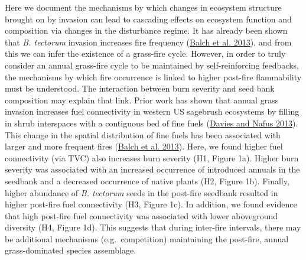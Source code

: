 \documentclass[
  12pt,
]{article}
\begin{document}
Here we document the mechanisms by which changes in ecosystem structure
brought on by invasion can lead to cascading effects on ecosystem
function and composition via changes in the disturbance regime. It has
already been shown that \emph{B. tectorum} invasion increases fire
frequency (\protect\hyperlink{ref-Balch2013}{Balch et al. 2013}), and
from this we can infer the existence of a grass-fire cycle. However, in
order to truly consider an annual grass-fire cycle to be maintained by
self-reinforcing feedbacks, the mechanisms by which fire occurrence is
linked to higher post-fire flammability must be understood. The
interaction between burn severity and seed bank composition may explain
that link. Prior work has shown that annual grass invasion increases
fuel connectivity in western US sagebrush ecosystems by filling in shrub
interspaces with a contiguous bed of fine fuels
(\protect\hyperlink{ref-Davies2013}{Davies and Nafus 2013}). This change
in the spatial distribution of fine fuels has been associated with
larger and more frequent fires (\protect\hyperlink{ref-Balch2013}{Balch
et al. 2013}). Here, we found higher fuel connectivity (via TVC) also
increases burn severity (H1, Figure 1a). Higher burn severity was
associated with an increased occurrence of introduced annuals in the
seedbank and a decreased occurrence of native plants (H2, Figure 1b).
Finally, higher abundance of \emph{B. tectorum} seeds in the post-fire
seedbank resulted in higher post-fire fuel connectivity (H3, Figure 1c).
In addition, we found evidence that high post-fire fuel connectivity was
associated with lower aboveground diversity (H4, Figure 1d). This
suggests that during inter-fire intervals, there may be additional
mechanisms (e.g.~competition) maintaining the post-fire, annual
grass-dominated species assemblage.
\end{document}
